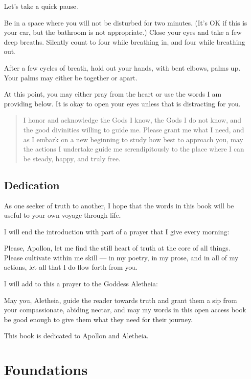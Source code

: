 \documentclass[
]{book}
\begin{document}
Let's take a quick pause.

Be in a space where you will not be disturbed for two minutes. (It's OK if this is your car, but the bathroom is not appropriate.) Close your eyes and take a few deep breaths. Silently count to four while breathing in, and four while breathing out.

After a few cycles of breath, hold out your hands, with bent elbows, palms up. Your palms may either be together or apart.

At this point, you may either pray from the heart or use the words I am providing below. It is okay to open your eyes unless that is distracting for you.

\begin{quote}
I honor and acknowledge the Gods I know, the Gods I do not know, and the good divinities willing to guide me. Please grant me what I need, and as I embark on a new beginning to study how best to approach you, may the actions I undertake guide me serendipitously to the place where I can be steady, happy, and truly free.
\end{quote}

\hypertarget{dedication}{%
\section{Dedication}\label{dedication}}

As one seeker of truth to another, I hope that the words in this book will be useful to your own voyage through life.

I will end the introduction with part of a prayer that I give every morning:

Please, Apollon, let me find the still heart of truth at the core of all things. Please cultivate within me skill --- in my poetry, in my prose, and in all of my actions, let all that I do flow forth from you.

I will add to this a prayer to the Goddess Aletheia:

May you, Aletheia, guide the reader towards truth and grant them a sip from your compassionate, abiding nectar, and may my words in this open access book be good enough to give them what they need for their journey.

This book is dedicated to Apollon and Aletheia.

\hypertarget{foundations}{%
\chapter{Foundations}\label{foundations}}
\end{document}
